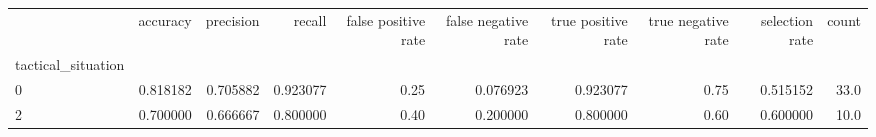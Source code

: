 \begin{tabular}{lrrrrrrrrr}
\toprule
{} &  accuracy &  precision &    recall &  false positive rate &  false negative rate &  true positive rate &  true negative rate &  selection rate &  count \\
tactical\_situation &           &            &           &                      &                      &                     &                     &                 &        \\
\midrule
0                  &  0.818182 &   0.705882 &  0.923077 &                 0.25 &             0.076923 &            0.923077 &                0.75 &        0.515152 &   33.0 \\
2                  &  0.700000 &   0.666667 &  0.800000 &                 0.40 &             0.200000 &            0.800000 &                0.60 &        0.600000 &   10.0 \\
\bottomrule
\end{tabular}
